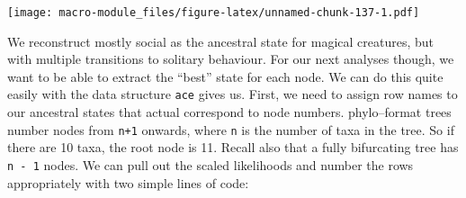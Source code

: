 \documentclass[]{book}
\newenvironment{Shaded}{\begin{snugshade}}{\end{snugshade}}
\newcommand{\KeywordTok}[1]{\textcolor[rgb]{0.13,0.29,0.53}{\textbf{{#1}}}}
\newcommand{\DataTypeTok}[1]{\textcolor[rgb]{0.13,0.29,0.53}{{#1}}}
\newcommand{\DecValTok}[1]{\textcolor[rgb]{0.00,0.00,0.81}{{#1}}}
\newcommand{\FloatTok}[1]{\textcolor[rgb]{0.00,0.00,0.81}{{#1}}}
\newcommand{\StringTok}[1]{\textcolor[rgb]{0.31,0.60,0.02}{{#1}}}
\newcommand{\NormalTok}[1]{{#1}}
\theoremstyle{definition}
\theoremstyle{definition}
\theoremstyle{definition}
\theoremstyle{remark}
\begin{document}
\begin{Shaded}
\end{Shaded}

\texttt{[image: macro-module\_files/figure-latex/unnamed-chunk-137-1.pdf]}

We reconstruct mostly social as the ancestral state for magical
creatures, but with multiple transitions to solitary behaviour. For our
next analyses though, we want to be able to extract the ``best'' state
for each node. We can do this quite easily with the data structure
\texttt{ace} gives us. First, we need to assign row names to our
ancestral states that actual correspond to node numbers. phylo--format
trees number nodes from \texttt{n+1} onwards, where \texttt{n} is the
number of taxa in the tree. So if there are 10 taxa, the root node is
11. Recall also that a fully bifurcating tree has \texttt{n\ -\ 1}
nodes. We can pull out the scaled likelihoods and number the rows
appropriately with two simple lines of code:

\begin{Shaded}
\end{Shaded}
\end{document}
